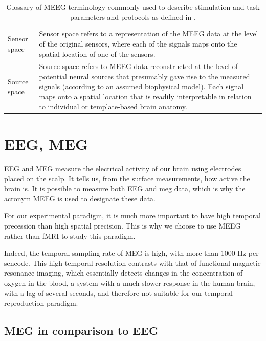 \begin{table}[ht]
\begin{tabular}{@{}| p{3cm}|p{10cm}| @{}}
        Sensor space & Sensor space refers to a representation of the MEEG data at the level of the original sensors, where each of the signals maps onto the spatial location of one of the sensors.                                                                                                                                           \\
        Source space & Source space refers to MEEG data reconstructed at the level of potential neural sources that presumably gave rise to the measured signals (according to an assumed biophysical model). Each signal maps onto a spatial location that is readily interpretable in relation to individual or template-based brain anatomy. \\
        \hline
    \end{tabular}
    \caption[Glossary of MEEG terminology commonly used to describe stimulation and task parameters and protocol.]%
    {Glossary of MEEG terminology commonly used to describe stimulation and task parameters and protocols as defined in \cite{pernet2018best}.}

    \label{Tab:Glossary_protocol}
\end{table}



\section{EEG, MEG}

EEG and MEG measure the electrical activity of our brain using electrodes placed on the scalp. It tells us, from the surface measurements, how active the brain is. It is possible to measure both EEG and meg data, which is why the acronym MEEG is used to designate these data.

For our experimental paradigm, it is much more important to have high temporal precession than high spatial precision. This is why we choose to use MEEG rather than fMRI to study this paradigm.

Indeed, the temporal sampling rate of MEG is high, with more than 1000 Hz per sencode. This high temporal resolution contrasts with that of functional magnetic resonance imaging, which essentially detects changes in the concentration of oxygen in the blood, a system with a much slower response in the human brain, with a lag of several seconds, and therefore not suitable for our temporal reproduction paradigm.


\subsection{MEG in comparison to EEG}

